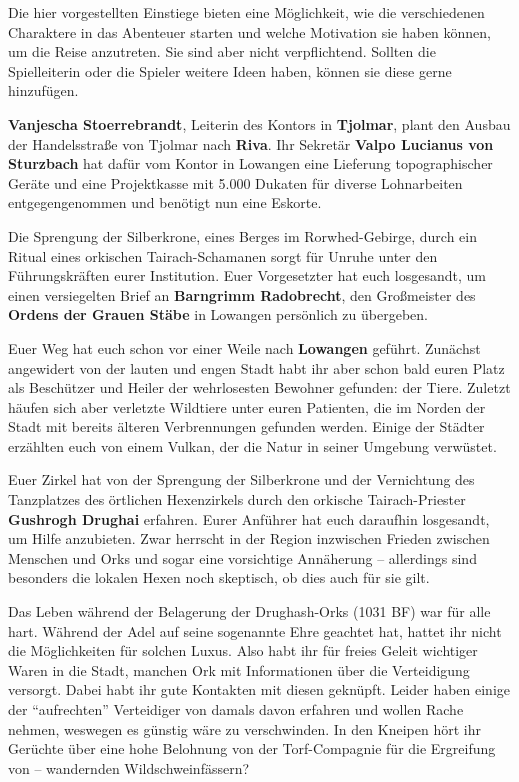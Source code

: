 \neuespalte

Die hier vorgestellten Einstiege bieten eine Möglichkeit, wie die verschiedenen Charaktere in das Abenteuer starten und welche Motivation sie haben können, um die Reise anzutreten.
Sie sind aber nicht verpflichtend.
Sollten die Spielleiterin oder die Spieler weitere Ideen haben, können sie diese gerne hinzufügen.


\textbf{Vanjescha Stoerrebrandt}, Leiterin des Kontors in \textbf{Tjolmar}, plant den Ausbau der Handelsstraße von Tjolmar nach \textbf{Riva}.
Ihr Sekretär \textbf{Valpo Lucianus von Sturzbach} hat dafür vom Kontor in Lowangen eine Lieferung topographischer Geräte und eine Projektkasse mit 5.000 Dukaten für diverse Lohnarbeiten entgegengenommen und benötigt nun eine Eskorte.

Die Sprengung der Silberkrone, eines Berges im Rorwhed-Gebirge, durch ein Ritual eines orkischen Tairach-Schamanen sorgt für Unruhe unter den Führungskräften eurer Institution.
Euer Vorgesetzter hat euch losgesandt, um einen versiegelten Brief an \textbf{Barngrimm Radobrecht}, den Großmeister des \textbf{Ordens der Grauen Stäbe} in Lowangen persönlich zu übergeben.

Euer Weg hat euch schon vor einer Weile nach \textbf{Lowangen} geführt.
Zunächst angewidert von der lauten und engen Stadt habt ihr aber schon bald euren Platz als Beschützer und Heiler der wehrlosesten Bewohner gefunden: der Tiere.
Zuletzt häufen sich aber verletzte Wildtiere unter euren Patienten, die im Norden der Stadt mit bereits älteren Verbrennungen gefunden werden.
Einige der Städter erzählten euch von einem Vulkan, der die Natur in seiner Umgebung verwüstet.


Euer Zirkel hat von der Sprengung der Silberkrone und der Vernichtung des Tanzplatzes des örtlichen Hexenzirkels durch den orkische Tairach-Priester \textbf{Gushrogh Drughai} erfahren.
Eurer Anführer hat euch daraufhin losgesandt, um Hilfe anzubieten.
Zwar herrscht in der Region inzwischen Frieden zwischen Menschen und Orks und sogar eine vorsichtige Annäherung --
allerdings sind besonders die lokalen Hexen noch skeptisch, ob dies auch für sie gilt.

Das Leben während der Belagerung der Drughash-Orks (1031 BF) war für alle hart.
Während der Adel auf seine sogenannte Ehre geachtet hat, hattet ihr nicht die Möglichkeiten für solchen Luxus.
Also habt ihr für freies Geleit wichtiger Waren in die Stadt, manchen Ork mit Informationen über die Verteidigung versorgt.
Dabei habt ihr gute Kontakten mit diesen geknüpft.
Leider haben einige der \enquote{aufrechten} Verteidiger von damals davon erfahren und wollen Rache nehmen, weswegen es günstig wäre zu verschwinden.
In den Kneipen hört ihr Gerüchte über eine hohe Belohnung von der Torf-Compagnie für die Ergreifung von -- wandernden Wildschweinfässern?

